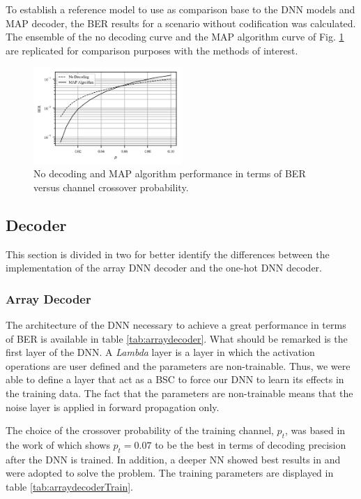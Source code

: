 \documentclass[conference]{IEEEtran}
\begin{document}
To establish a reference model to use as comparison base to the DNN models and MAP decoder, the BER results for a scenario without codification was calculated. The ensemble of the no decoding curve and the MAP algorithm curve of Fig. \ref{fig:MAP} are replicated for comparison purposes with the methods of interest.

\begin{figure}[!ht]
  \centering
    \includegraphics[width=0.5\textwidth]{images/MAP-alone-curve}
    \caption{No decoding and MAP algorithm performance in terms of BER versus channel crossover probability.}\label{fig:MAP}
\end{figure}

\subsection{Decoder}

This section is divided in two for better identify the differences between the implementation of the array DNN decoder and the one-hot DNN decoder.

\subsubsection{Array Decoder}

The architecture of the DNN necessary to achieve a great performance in terms of BER is available in table \ref{tab:arraydecoder}. What should be remarked is the first layer of the DNN. A \textit{Lambda} layer is a layer in which the activation operations are user defined and the parameters are non-trainable. Thus, we were able to define a layer that act as a BSC to force our DNN to learn its effects in the training data. The fact that the parameters are non-trainable means that the noise layer is applied in forward propagation only.

The choice of the crossover probability of the training channel, $p_{t}$, was based in the work of \cite{DBLP:conf/acssc/BenammarP18} which shows $p_{t}=0.07$ to be the best in terms of decoding precision after the DNN is trained. In addition, a deeper NN showed best results in \cite{DBLP:journals/corr/OSheaH17} and were adopted to solve the problem. The training parameters are displayed in table \ref{tab:arraydecoderTrain}.
\end{document}
